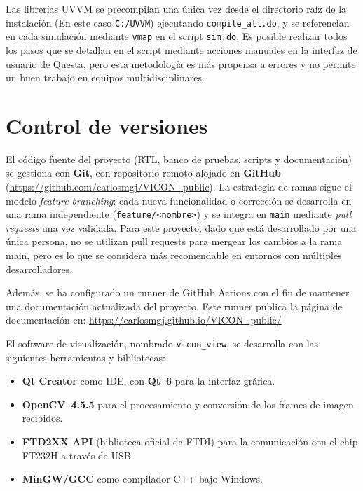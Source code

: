 \documentclass[../main.tex]{subfiles}
\begin{document}
Las librerías \ac{UVVM} se precompilan una única vez desde el directorio raíz de la instalación (En este caso \texttt{C:/UVVM}) ejecutando \texttt{compile\_all.do}, y se referencian en cada simulación mediante \texttt{vmap} en el script \texttt{sim.do}. Es posible realizar todos los pasos que se detallan en el script mediante acciones manuales en la interfaz de usuario de Questa, pero esta metodología es más propensa a errores y no permite un buen trabajo en equipos multidisciplinares.
 
\section{Control de versiones}
 
El código fuente del proyecto (RTL, banco de pruebas, scripts y documentación) se gestiona con \textbf{Git}, con repositorio remoto alojado en \textbf{GitHub} (\url{https://github.com/carlosmgj/VICON_public}). La estrategia de ramas sigue el modelo \textit{feature branching}: cada nueva funcionalidad o corrección se desarrolla en una rama independiente (\texttt{feature/<nombre>}) y se integra en \texttt{main} mediante \textit{pull requests} una vez validada. Para este proyecto, dado que está desarrollado por una única persona, no se utilizan pull requests para mergear los cambios a la rama main, pero es lo que se considera más recomendable en entornos con múltiples desarrolladores.

Además, se ha configurado un runner de GitHub Actions con el fin de mantener una documentación actualizada del proyecto. Este runner publica la página de documentación en: \url{https://carlosmgj.github.io/VICON_public/}

El software de visualización, nombrado \texttt{vicon\_view}, se desarrolla con las siguientes herramientas y bibliotecas:
 
\begin{itemize}
    \item \textbf{Qt Creator} como \ac{IDE}, con \textbf{Qt~6} para la interfaz gráfica.
    \item \textbf{OpenCV~4.5.5} para el procesamiento y conversión de los frames de imagen recibidos.
    \item \textbf{FTD2XX API} (biblioteca oficial de FTDI) para la comunicación con el chip FT232H a través de USB.
    \item \textbf{MinGW/GCC} como compilador C++ bajo Windows.
\end{itemize}
\end{document}
